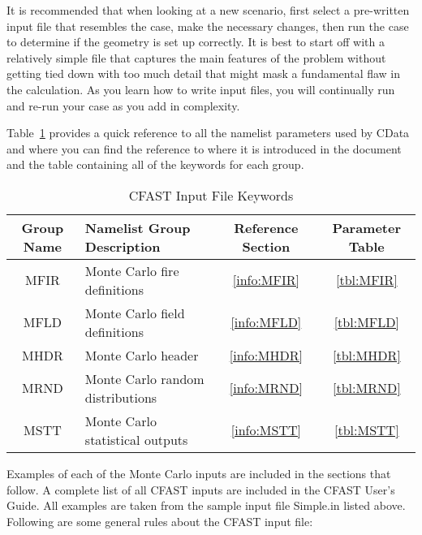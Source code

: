 It is recommended that when looking at a new scenario, first select a pre-written input file that resembles the case, make the necessary changes, then run the case to determine if the geometry is set up correctly. It is best to start off with a relatively simple file that captures the main features of the problem without getting tied down with too much detail that might mask a fundamental flaw in the calculation. As you learn how to write input files, you will continually run and re-run your case as you add in complexity.

Table~\ref{tbl:namelistgroups} provides a quick reference to all the namelist parameters used by CData and where you can find the reference to where it is introduced in the document and the table containing all of the keywords for each group.


\begin{table}[ht]
\begin{center}
\caption{CFAST Input File Keywords}
\label{tbl:namelistgroups}
\begin{tabular}{|c|l|c|c|}
\hline
Group Name   & Namelist Group Description       & Reference Section & Parameter Table  \\ \hline
{\ct MFIR}   & Monte Carlo fire definitions     & \ref{info:MFIR}   & \ref{tbl:MFIR}   \\ \hline
{\ct MFLD}   & Monte Carlo field definitions    & \ref{info:MFLD}   & \ref{tbl:MFLD}   \\ \hline
{\ct MHDR}   & Monte Carlo header               & \ref{info:MHDR}   & \ref{tbl:MHDR}   \\ \hline
{\ct MRND}   & Monte Carlo random distributions & \ref{info:MRND}   & \ref{tbl:MRND}   \\ \hline
{\ct MSTT}   & Monte Carlo statistical outputs  & \ref{info:MSTT}   & \ref{tbl:MSTT}   \\ \hline
\end{tabular}
\end{center}
\end{table}

Examples of each of the Monte Carlo inputs are included in the sections that follow. A complete list of all CFAST inputs are included in the CFAST User's Guide.  All examples are taken from the sample input file {\ct Simple.in} listed above. Following are some general rules about the CFAST input file:

